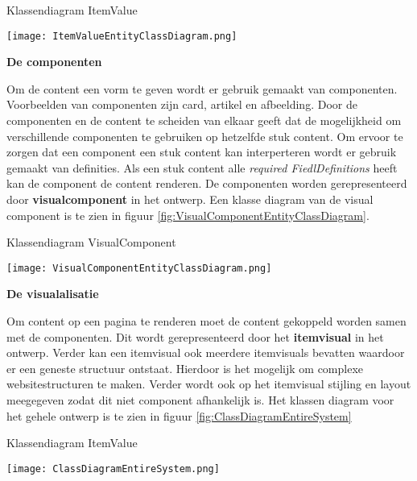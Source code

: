 \whitespace[2]
\begin{graphic}
    \captionsetup{type=figure}
    \caption{Klassendiagram ItemValue}
    \texttt{[image: ItemValueEntityClassDiagram.png]}
    \label{fig:DeContentClassDiagram}
\end{graphic}

\newpage

\whitespace
\textbf{De componenten}

\whitespace
Om de content een vorm te geven wordt er gebruik gemaakt van componenten.
Voorbeelden van componenten zijn card, artikel en afbeelding.
Door de componenten en de content te scheiden van elkaar geeft dat de mogelijkheid om verschillende componenten te gebruiken op hetzelfde stuk content.
Om ervoor te zorgen dat een component een stuk content kan interperteren wordt er gebruik gemaakt van definities.
Als een stuk content alle \textit{required FiedlDefinitions} heeft kan de component de content renderen.
De componenten worden gerepresenteerd door \textbf{visualcomponent} in het ontwerp. 
Een klasse diagram van de visual component is te zien in figuur \ref{fig:VisualComponentEntityClassDiagram}.

\whitespace[2]
\begin{graphic}
    \captionsetup{type=figure}
    \caption{Klassendiagram VisualComponent}
    \texttt{[image: VisualComponentEntityClassDiagram.png]}
    \label{fig:VisualComponentEntityClassDiagram}
\end{graphic}

\whitespace
\textbf{De visualalisatie}

\whitespace
Om content op een pagina te renderen moet de content gekoppeld worden samen met de componenten.
Dit wordt gerepresenteerd door het \textbf{itemvisual} in het ontwerp.
Verder kan een itemvisual ook meerdere itemvisuals bevatten waardoor er een geneste structuur ontstaat.
Hierdoor is het mogelijk om complexe websitestructuren te maken.
Verder wordt ook op het itemvisual stijling en layout meegegeven zodat dit niet component afhankelijk is.
Het klassen diagram voor het gehele ontwerp is te zien in figuur \ref{fig:ClassDiagramEntireSystem}

\newpage
\begin{graphic}
    \captionsetup{type=figure}
    \caption{Klassendiagram ItemValue}
    \texttt{[image: ClassDiagramEntireSystem.png]}
    \label{fig:ClassDiagramEntireSystem}
\end{graphic}

